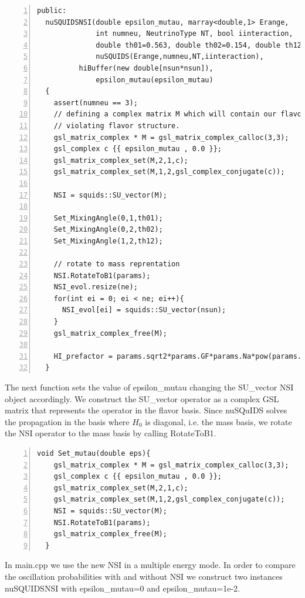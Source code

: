 \documentclass[3p,12pt]{elsarticle}
\newcommand{\ttf}{\ttfamily}
\begin{document}
\begin{lstlisting}[frame=leftline, numbers =
  left,breaklines=true,label = ex:sin1,firstnumber=last]
  public:
  nuSQUIDSNSI(double epsilon_mutau, marray<double,1> Erange,
              int numneu, NeutrinoType NT, bool iinteraction,
              double th01=0.563, double th02=0.154, double th12=0.785):
              nuSQUIDS(Erange,numneu,NT,iinteraction),
	      hiBuffer(new double[nsun*nsun]),
              epsilon_mutau(epsilon_mutau)
  {
    assert(numneu == 3);
    // defining a complex matrix M which will contain our flavor
    // violating flavor structure.
    gsl_matrix_complex * M = gsl_matrix_complex_calloc(3,3);
    gsl_complex c {{ epsilon_mutau , 0.0 }};
    gsl_matrix_complex_set(M,2,1,c);
    gsl_matrix_complex_set(M,1,2,gsl_complex_conjugate(c));
    
    NSI = squids::SU_vector(M);
    
    Set_MixingAngle(0,1,th01);
    Set_MixingAngle(0,2,th02);
    Set_MixingAngle(1,2,th12);
    
    // rotate to mass reprentation
    NSI.RotateToB1(params);
    NSI_evol.resize(ne);
    for(int ei = 0; ei < ne; ei++){
      NSI_evol[ei] = squids::SU_vector(nsun);
    }
    gsl_matrix_complex_free(M);
    
    HI_prefactor = params.sqrt2*params.GF*params.Na*pow(params.cm,-3);
  }
\end{lstlisting}

The next function sets the value of {\ttf epsilon\_mutau} changing the
 {\ttf SU\_vector NSI} object accordingly. We construct the {\ttf
   SU\_vector} operator as a complex GSL matrix that represents the
 operator in the flavor basis. Since nuSQuIDS solves the propagation
 in the basis where $H_0$ is diagonal, i.e. the mass basis, we rotate
 the NSI operator to the mass basis by calling {\ttf RotateToB1}.

\begin{lstlisting}[frame=leftline, numbers =
  left,breaklines=true,label = ex:sin1,firstnumber=last]
  void Set_mutau(double eps){
    gsl_matrix_complex * M = gsl_matrix_complex_calloc(3,3);
    gsl_complex c {{ epsilon_mutau , 0.0 }};
    gsl_matrix_complex_set(M,2,1,c);
    gsl_matrix_complex_set(M,1,2,gsl_complex_conjugate(c));
    NSI = squids::SU_vector(M);    
    NSI.RotateToB1(params);
    gsl_matrix_complex_free(M);
  }
\end{lstlisting}

In {\ttf main.cpp} we use the new NSI in a
multiple energy mode. In order to compare the oscillation
probabilities with and without NSI we construct two instances {\ttf
  nuSQUIDSNSI} with {\ttf  epsilon\_mutau=0} and {\ttf
  epsilon\_mutau=1e-2}. 
\end{document}
